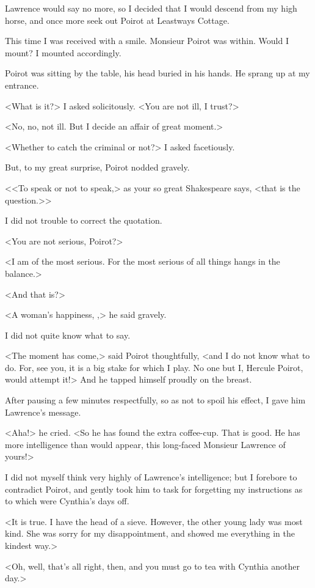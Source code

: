  Lawrence would say no more, so I decided that I would descend from my high horse, and once more seek out Poirot at Leastways Cottage. 

 This time I was received with a smile. Monsieur Poirot was within. Would I mount? I mounted accordingly. 

 Poirot was sitting by the table, his head buried in his hands. He sprang up at my entrance. 

 <What is it?> I asked solicitously. <You are not ill, I trust?> 

 <No, no, not ill. But I decide an affair of great moment.> 

 <Whether to catch the criminal or not?> I asked facetiously. 

 But, to my great surprise, Poirot nodded gravely. 

 <<To speak or not to speak,> as your so great Shakespeare says, <that is the question.>> 

 I did not trouble to correct the quotation. 

 <You are not serious, Poirot?> 

 <I am of the most serious. For the most serious of all things hangs in the balance.> 

 <And that is?> 

 <A woman's happiness, ,> he said gravely. 

 I did not quite know what to say. 

 <The moment has come,> said Poirot thoughtfully, <and I do not know what to do. For, see you, it is a big stake for which I play. No one but I, Hercule Poirot, would attempt it!> And he tapped himself proudly on the breast. 

 After pausing a few minutes respectfully, so as not to spoil his effect, I gave him Lawrence's message. 

 <Aha!> he cried. <So he has found the extra coffee-cup. That is good. He has more intelligence than would appear, this long-faced Monsieur Lawrence of yours!> 

 I did not myself think very highly of Lawrence's intelligence; but I forebore to contradict Poirot, and gently took him to task for forgetting my instructions as to which were Cynthia's days off. 

 <It is true. I have the head of a sieve. However, the other young lady was most kind. She was sorry for my disappointment, and showed me everything in the kindest way.> 

 <Oh, well, that's all right, then, and you must go to tea with Cynthia another day.> 

